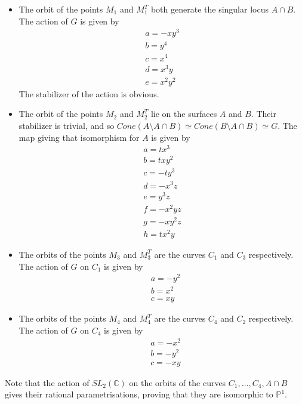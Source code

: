 \documentclass{amsart}
\begin{document}
\begin{itemize}
  \item The orbit of the points $M_1$ and $M_1^T$ both generate the singular locus $A \cap B$. The action of $G$ is given by
  \begin{align*}
&  a = -x y^{3}\\
  &b = y^{4}\\
  &c = x^{4}\\
  &d = x^{3} y\\
  &e = x^{2} y^{2}
  &\end{align*}
  The stabilizer of the action is obvious.

  \item The orbit of the points $M_2$ and $M_2^T$ lie on the surfaces $A$ and $B$. Their stabilizer is trivial, and so $Cone(A\setminus A\cap B) \simeq Cone(B \setminus A \cap B) \simeq G$.
  The map giving that isomorphism for $A$ is given by 
  \begin{align*}
&  a = t x^{3}\\
  &b = t x y^{2}\\
  &c = -t y^{3}\\
  &d = -x^{3} z\\
  &e = y^{3} z\\
  &f = -x^{2} y z\\
  &g = -x y^{2} z\\
  &h = t x^{2} y
  &\end{align*}
 \item  The orbits of the points $M_3$ and $M_3^T$ are the curves $C_1$ and $C_3$ respectively. 
  The action of $G$ on $C_1$ is given by
  \begin{align*}
  &a = -y^2\\
  &b = x^2\\
  &c = xy
  \end{align*}

  \item  The orbits of the points $M_4$ and $M_4^T$ are the curves $C_4$ and $C_2$ respectively. 
  The action of $G$ on $C_4$ is given by
  \begin{align*}
  &a = -x^2\\
  &b = -y^2\\
  &c = -xy
  \end{align*}
\end{itemize}

Note that the action of $SL_2(\mathbb{C})$ on the orbits of the curves $C_1, \ldots, C_4, A\cap B$ gives their rational parametrisations, proving that they are isomorphic to $\mathbb{P}^1$.
\end{document}
